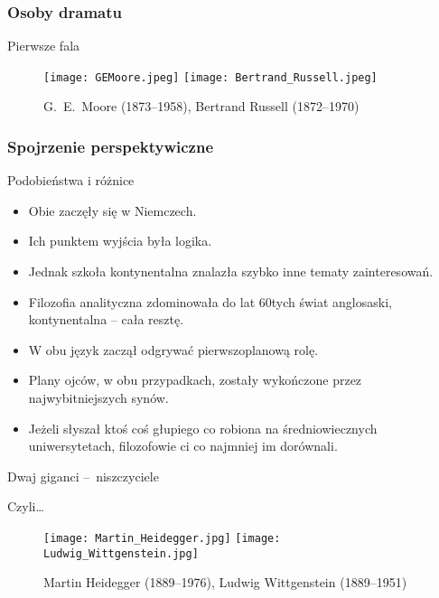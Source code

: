 \documentclass{beamer}  %
\begin{document}
\begin{frame}
  \frametitle{Osoby dramatu}

  \begin{block}{Pierwsze fala}
    \begin{figure}
      \centering

      \texttt{[image: GEMoore.jpeg]}
      \texttt{[image: Bertrand\_Russell.jpeg]}

      \caption{G.~E.~Moore (1873--1958), Bertrand Russell
        (1872--1970)}
    \end{figure}
  \end{block}

\end{frame}



\begin{frame}
  \frametitle{Spojrzenie perspektywiczne}

  \begin{block}{Podobieństwa i różnice}
    \begin{itemize}
    \item Obie zaczęły się w Niemczech.
    \item Ich punktem wyjścia była logika.
    \item Jednak szkoła kontynentalna znalazła szybko inne tematy
      zainteresowań.
    \item Filozofia analityczna zdominowała do lat 60\dywiz tych świat
      anglosaski, kontynentalna -- cała resztę.
    \item W obu język zaczął odgrywać pierwszoplanową rolę.
    \item Plany ojców, w obu przypadkach, zostały wykończone przez
      najwybitniejszych synów.
    \item Jeżeli słyszał ktoś coś głupiego co robiona na
      średniowiecznych uniwersytetach, filozofowie ci co najmniej im
      dorównali.
    \end{itemize}
  \end{block}

\end{frame}



\begin{frame}{Dwaj giganci --~niszczyciele}
  \pause

  \begin{block}{Czyli\ldots}
    \begin{figure}
      \centering

      \texttt{[image: Martin\_Heidegger.jpg]}
      \texttt{[image: Ludwig\_Wittgenstein.jpg]} \pause

      \caption{Martin Heidegger (1889--1976), Ludwig Wittgenstein
        (1889--1951)}
    \end{figure}
  \end{block}

\end{frame}
\end{document}
